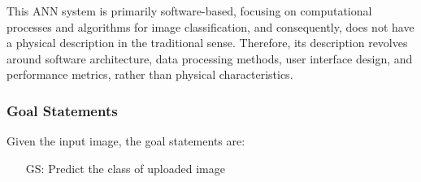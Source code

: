 \documentclass[12pt]{article}
\newcounter{goalnum} %
\begin{document}

This ANN system is primarily software-based, focusing on computational processes and 
algorithms for image classification, and consequently, does not have a physical description in the 
traditional sense. Therefore, its description revolves around software architecture, data 
processing methods, user interface design, and performance metrics, rather than physical characteristics.







\subsubsection{Goal Statements}\label{GoalStatements}


\noindent Given the input image, the goal statements are:

\begin{itemize}

\item[GS\refstepcounter{goalnum}\thegoalnum \label{G_meaningfulLabel}:] 
    Predict the class of uploaded image
\end{itemize}
\end{document}
